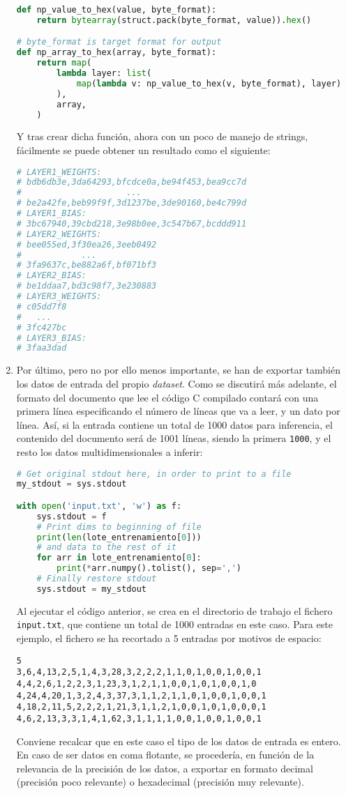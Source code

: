 \begin{enumerate}
\begin{lstlisting}[language=Python]
def np_value_to_hex(value, byte_format):
    return bytearray(struct.pack(byte_format, value)).hex()

# byte_format is target format for output
def np_array_to_hex(array, byte_format):
    return map(
        lambda layer: list(
            map(lambda v: np_value_to_hex(v, byte_format), layer)
        ),
        array,
    )
\end{lstlisting}
    Y tras crear dicha función, ahora con un poco de manejo de strings, fácilmente se puede obtener un resultado como el siguiente:\medskip
\begin{lstlisting}[language=Python]
# LAYER1_WEIGHTS:
# bdb6db3e,3da64293,bfcdce0a,be94f453,bea9cc7d
#                     ...
# be2a42fe,beb99f9f,3d1237be,3de90160,be4c799d
# LAYER1_BIAS:
# 3bc67940,39cbd218,3e98b0ee,3c547b67,bcddd911
# LAYER2_WEIGHTS:
# bee055ed,3f30ea26,3eeb0492
#            ...
# 3fa9637c,be882a6f,bf071bf3
# LAYER2_BIAS:
# be1ddaa7,bd3c98f7,3e230883
# LAYER3_WEIGHTS:
# c05dd7f8
#   ...
# 3fc427bc
# LAYER3_BIAS:
# 3faa3dad
\end{lstlisting}

    \item Por último, pero no por ello menos importante, se han de exportar también los datos de entrada del propio \textit{dataset}. Como se discutirá más adelante, el formato del documento que lee el código C compilado contará con una primera línea especificando el número de líneas que va a leer, y un dato por línea. Así, si la entrada contiene un total de 1000 datos para inferencia, el contenido del documento será de 1001 líneas, siendo la primera \texttt{1000}, y el resto los datos multidimensionales a inferir:\medskip
\begin{lstlisting}[language=Python]
# Get original stdout here, in order to print to a file
my_stdout = sys.stdout

with open('input.txt', 'w') as f:
    sys.stdout = f
    # Print dims to beginning of file
    print(len(lote_entrenamiento[0]))
    # and data to the rest of it
    for arr in lote_entrenamiento[0]:
        print(*arr.numpy().tolist(), sep=',')
    # Finally restore stdout
    sys.stdout = my_stdout
\end{lstlisting}
    Al ejecutar el código anterior, se crea en el directorio de trabajo el fichero \texttt{input.txt}, que contiene un total de 1000 entradas en este caso. Para este ejemplo, el fichero se ha recortado a 5 entradas por motivos de espacio:\medskip
\begin{lstlisting}
5
3,6,4,13,2,5,1,4,3,28,3,2,2,2,1,1,0,1,0,0,1,0,0,1
4,4,2,6,1,2,2,3,1,23,3,1,2,1,1,0,0,1,0,1,0,0,1,0
4,24,4,20,1,3,2,4,3,37,3,1,1,2,1,1,0,1,0,0,1,0,0,1
4,18,2,11,5,2,2,2,1,21,3,1,1,2,1,0,0,1,0,1,0,0,0,1
4,6,2,13,3,3,1,4,1,62,3,1,1,1,1,0,0,1,0,0,1,0,0,1
\end{lstlisting}

    Conviene recalcar que en este caso el tipo de los datos de entrada es entero. En caso de ser datos en coma flotante, se procedería, en función de la relevancia de la precisión de los datos, a exportar en formato decimal (precisión poco relevante) o hexadecimal (precisión muy relevante).
\end{enumerate}

